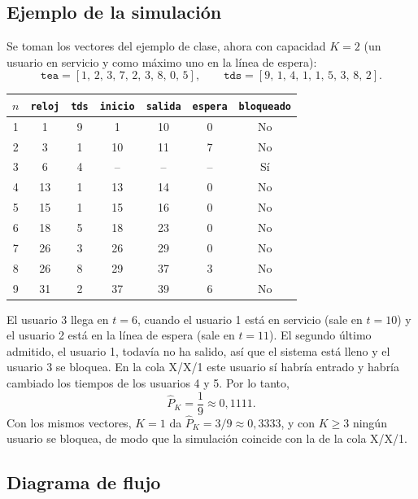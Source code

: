 \documentclass[12pt]{article}
\begin{document}
\subsection{Ejemplo de la simulación}

Se toman los vectores del ejemplo de clase, ahora con capacidad $K=2$ (un usuario en servicio y como máximo uno en la línea de espera):
\[
\texttt{tea}=[1,\,2,\,3,\,7,\,2,\,3,\,8,\,0,\,5],\qquad
\texttt{tds}=[9,\,1,\,4,\,1,\,1,\,5,\,3,\,8,\,2].
\]

\begin{center}
\begin{tabular}{c c c c c c c}
\hline
$n$ & \texttt{reloj} & \texttt{tds} & \texttt{inicio} & \texttt{salida} & \texttt{espera} & \texttt{bloqueado} \\
\hline
1 & 1  & 9 & 1  & 10 & 0 & No \\
2 & 3  & 1 & 10 & 11 & 7 & No \\
3 & 6  & 4 & -- & -- & -- & Sí \\
4 & 13 & 1 & 13 & 14 & 0 & No \\
5 & 15 & 1 & 15 & 16 & 0 & No \\
6 & 18 & 5 & 18 & 23 & 0 & No \\
7 & 26 & 3 & 26 & 29 & 0 & No \\
8 & 26 & 8 & 29 & 37 & 3 & No \\
9 & 31 & 2 & 37 & 39 & 6 & No \\
\hline
\end{tabular}
\end{center}

El usuario 3 llega en $t=6$, cuando el usuario 1 está en servicio (sale en $t=10$) y el usuario 2 está en la línea de espera (sale en $t=11$). El segundo último admitido, el usuario 1, todavía no ha salido, así que el sistema está lleno y el usuario 3 se bloquea. En la cola X/X/1 este usuario sí habría entrado y habría cambiado los tiempos de los usuarios 4 y 5. Por lo tanto,
\[
\hat{P}_K=\frac{1}{9}\approx 0{,}1111 .
\]
Con los mismos vectores, $K=1$ da $\hat{P}_K=3/9\approx0{,}3333$, y con $K\geq 3$ ningún usuario se bloquea, de modo que la simulación coincide con la de la cola X/X/1.

\subsection{Diagrama de flujo}
\end{document}
